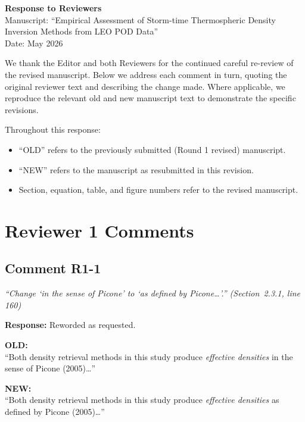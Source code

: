 \documentclass[11pt]{article}
\newcommand{\reviewercomment}[1]{%
  \medskip
  \noindent\textit{\color{reviewblue}#1}%
  \medskip
}
\newcommand{\oldtext}[1]{%
  \smallskip
  \noindent\hspace{1em}\begin{minipage}{0.92\textwidth}%
  \color{quotegray}\textbf{OLD:}\\[2pt]``#1''%
  \end{minipage}%
  \smallskip
}
\newcommand{\newtext}[1]{%
  \smallskip
  \noindent\hspace{1em}\begin{minipage}{0.92\textwidth}%
  \color{quotegreen}\textbf{NEW:}\\[2pt]``#1''%
  \end{minipage}%
  \smallskip
}
\begin{document}
\begin{center}
{\LARGE\bfseries Response to Reviewers}\\[12pt]
{\large Manuscript: ``Empirical Assessment of Storm-time Thermospheric Density\\
Inversion Methods from LEO POD Data''}\\[8pt]
{\normalsize Date: May 2026}
\end{center}

\bigskip

We thank the Editor and both Reviewers for the continued careful re-review of the revised manuscript. Below we address each comment in turn, quoting the original reviewer text and describing the change made. Where applicable, we reproduce the relevant old and new manuscript text to demonstrate the specific revisions.

Throughout this response:
\begin{itemize}[nosep]
  \item ``OLD'' refers to the previously submitted (Round 1 revised) manuscript.
  \item ``NEW'' refers to the manuscript as resubmitted in this revision.
  \item Section, equation, table, and figure numbers refer to the revised manuscript.
\end{itemize}


\section{Reviewer 1 Comments}

\subsection{Comment R1-1}

\reviewercomment{%
``Change `in the sense of Picone' to `as defined by Picone\ldots'.''
\;(Section~2.3.1, line 160)}

\textbf{Response:} Reworded as requested.

\oldtext{Both density retrieval methods in this study produce \emph{effective densities} in the sense of Picone (2005)\ldots}

\newtext{Both density retrieval methods in this study produce \emph{effective densities} as defined by Picone (2005)\ldots}
\end{document}

